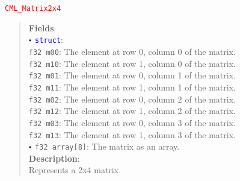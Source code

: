 \documentclass[a4paper,oneside,8pt]{extarticle}
\newcommand{\union}[1]{
  \noindent\textcolor{red}{\texttt{#1}}
  \vspace{-0.3em}
}
\renewcommand{\dot}{\raisebox{0.3ex}{\scalebox{0.6}{$\bullet$}}}
\theoremstyle{definition}
\begin{document}
\union{CML\_Matrix2x4}
\begin{quote}
  \textbf{Fields}: \\
  $\dot$ \textcolor{blue}{\texttt{struct}}: \\
  \indent\hspace{1em} \texttt{f32 m00}: The element at row 0, column 0 of the matrix. \\
  \indent\hspace{1em} \texttt{f32 m10}: The element at row 1, column 0 of the matrix. \\
  \indent\hspace{1em} \texttt{f32 m01}: The element at row 0, column 1 of the matrix. \\
  \indent\hspace{1em} \texttt{f32 m11}: The element at row 1, column 1 of the matrix. \\
  \indent\hspace{1em} \texttt{f32 m02}: The element at row 0, column 2 of the matrix. \\
  \indent\hspace{1em} \texttt{f32 m12}: The element at row 1, column 2 of the matrix. \\
  \indent\hspace{1em} \texttt{f32 m03}: The element at row 0, column 3 of the matrix. \\
  \indent\hspace{1em} \texttt{f32 m13}: The element at row 1, column 3 of the matrix. \\
  $\dot$ \texttt{f32 array[8]}: The matrix as an array. \\

  \vspace{-0.75em}
  \textbf{Description}: \\
  Represents a 2x4 matrix. \\
\end{quote}
\end{document}
